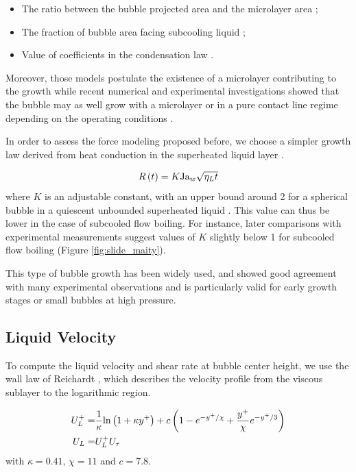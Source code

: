 \begin{itemize}
\item The ratio between the bubble projected area and the microlayer area ;
\item The fraction of bubble area facing subcooling liquid ;
\item Value of coefficients in the condensation law \cite{levenspiel_collapse_1959}.
\end{itemize}

Moreover, those models postulate the existence of a microlayer contributing to the growth while recent numerical and experimental investigations showed that the bubble may as well grow with a microlayer or in a pure contact line regime depending on the operating conditions \cite{urbano_direct_2018, bures_modelling_2021, kossolapov_experimental_2021}.

In order to assess the force modeling proposed before, we choose a simpler growth law derived from heat conduction in the superheated liquid layer \cite{plesset_growth_1954}. 

\begin{equation}
R\left( t \right) = K\mathrm{Ja}_{w} \sqrt{\eta_{L}t}
\end{equation}
where $K$ is an adjustable constant, with an upper bound around 2 for a spherical bubble in a quiescent unbounded superheated liquid \cite{plesset_growth_1954, yun_prediction_2012}. This value can thus be lower in the case of subcooled flow boiling. For instance, later comparisons with experimental measurements suggest values of $K$ slightly below 1 for subcooled flow boiling (Figure \ref{fig:slide_maity}).

This type of bubble growth has been widely used, and showed good agreement with many experimental observations and is particularly valid for early growth stages or small bubbles at high pressure.


\subsection{Liquid Velocity}\label{subsec:liq_vel}

To compute the liquid velocity and shear rate at bubble center height, we use the wall law of Reichardt \cite{reichardt_vollstandige_1951}, which describes the velocity profile from the viscous sublayer to the logarithmic region.

\begin{align}
U_{L}^{+} =& \frac{1}{\kappa}\ln{1+\kappa y^{+}} + c \parth{1-e^{-y^{+}/\chi} + \frac{y^{+}}{\chi}e^{-y^{+}/3} }\\
%
\nonumber U_{L}=&U_{L}^{+}U_{\tau}
\end{align}
with $\kappa = 0.41$, $\chi = 11$ and $c=7.8$.


